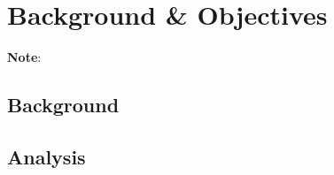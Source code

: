\chapter{Background \& Objectives}


\textbf{Note}: 

   
   

\section{Background}


\section{Analysis}



